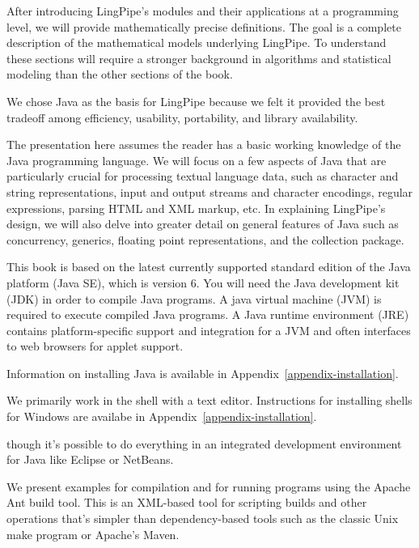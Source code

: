 After introducing LingPipe's modules and their applications at a
programming level, we will provide mathematically precise definitions.
The goal is a complete description of the mathematical models
underlying LingPipe.  To understand these sections will require a
stronger background in algorithms and statistical modeling than
the other sections of the book.
        



\noindent
We chose Java as the basis for LingPipe because we felt it provided
the best tradeoff among efficiency, usability, portability, and
library availability.

The presentation here assumes the reader has a basic working knowledge
of the Java programming language.  We will focus on a few aspects of
Java that are particularly crucial for processing textual language
data, such as character and string representations, input and output
streams and character encodings, regular expressions, parsing HTML and
XML markup, etc.  In explaining LingPipe's design, we will also delve
into greater detail on general features of Java such as concurrency,
generics, floating point representations, and the collection package.


\noindent
This book is based on the latest currently supported standard edition
of the Java platform (Java SE), which is version 6.  You will need the
Java development kit (JDK) in order to compile Java programs.  A java
virtual machine (JVM) is required to execute compiled Java programs.
A Java runtime environment (JRE) contains platform-specific support
and integration for a JVM and often interfaces to web browsers for
applet support.

Information on installing Java is available in Appendix~\ref{appendix-installation}.



\noindent
We primarily work in the shell with a text editor. Instructions for
installing shells for Windows are availabe in Appendix~\ref{appendix-installation}.

though it's
possible to do everything in an integrated development environment for
Java like Eclipse or NetBeans.

We present examples for compilation and for running programs using the
Apache Ant build tool.  This is an XML-based tool for scripting builds
and other operations that's simpler than dependency-based tools such
as the classic Unix make program or Apache's Maven.  



